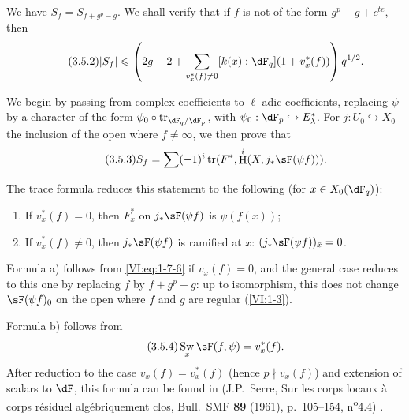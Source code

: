 \documentclass[oneside]{book}
\DeclareMathOperator{\h}{H}
\DeclareMathOperator{\swan}{Sw}
\DeclareMathOperator{\tr}{tr}
\newcounter{char}
\theoremstyle{sga-source}
\theoremstyle{sga-source-dash}
\theoremstyle{sga-source-dotdash}
\theoremstyle{sga-source-number-note-dash}
\theoremstyle{sga-source-note-number-dotdash}
\theoremstyle{sga-source-example-dotdash}
\theoremstyle{sga-source-inline-number}
\theoremstyle{sga-source-bare-number}
\theoremstyle{sga-source}
\begin{document}
We have $S_f=S_{f+g^p-g}$. We shall verify that if $f$ is not of the 
form $g^p-g+c^{t e}$, then 
\begin{equation*}\tag{3.5.2}\label{VI:eq:3-5-2}
  |S_f|\leqslant \left(2 g-2+\sum_{v_x^\ast(f)\ne 0} [k(x):\dF_q] (1+v_x^\ast(f))\right) q^{1/2} \text{.}
\end{equation*}

We begin by passing from complex coefficients to $\ell$-adic coefficients, replacing $\psi$ by 
a character of the form $\psi_0\circ \tr_{\dF_q/\dF_p}$, with 
$\psi_0:\dF_p\hookrightarrow E_\lambda^\ast$. For $j:U_0\hookrightarrow X_0$ 
the inclusion of the open where $f\ne\infty$, we then prove that 
\begin{equation*}\tag{3.5.3}\label{VI:eq:3-5-3}
  S_f = \sum (-1)^i \tr(F^\ast,\h^i(X,j_\ast \sF(\psi f))) \text{.} 
\end{equation*}

The trace formula reduces this statement to the following (for 
$x\in X_0(\dF_q)$): 
\begin{enumerate}[\indent a)]
  \item If $v_x^\ast(f)=0$, then $F_x^\ast$ on $j_\ast \sF(\psi f)$ is 
    $\psi(f(x))$; 
  \item If $v_x^\ast(f)\ne 0$, then $j_\ast \sF(\psi f)$ is ramified at $x$: 
    $(j_\ast \sF(\psi f))_{\bar x}=0$. 
\end{enumerate}

Formula a) follows from \eqref{VI:eq:1-7-6} if $v_x(f)=0$, and the general 
case reduces to this one by replacing $f$ by $f+g^p-g$: up to isomorphism, this 
does not change $\sF(\psi f)_0$ on the open where $f$ and $g$ are regular 
(\ref{VI:1-3}). 

Formula b) follows from 
\begin{equation*}\tag{3.5.4}\label{VI:eq:3-5-4}
  \swan_x \sF(f,\psi) = v_x^\ast(f) \text{.} 
\end{equation*}
After reduction to the case $v_x(f)=v_x^\ast(f)$ (hence $p\nmid v_x(f)$) 
and extension of scalars to $\dF$, this formula can be found in 
(J.P.~Serre, Sur les corps locaux à corps résiduel algébriquement clos, Bull.~SMF \textbf{89} (1961), p.~105--154, n\textsuperscript{o}4.4) \cite[4.4]{se61}.
\end{document}
